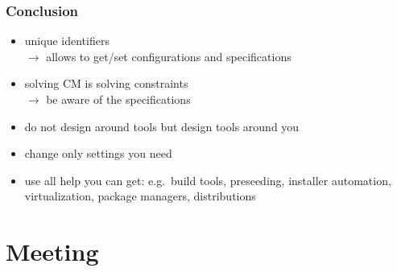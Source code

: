 \begin{frame}
	\frametitle{Conclusion}

	\begin{itemize}[<+-| alert@+>]
	\item unique identifiers \\ $\rightarrow$ allows to get/set configurations and specifications
	\item solving CM is solving constraints \\ $\rightarrow$ be aware of the specifications
	\item do not design around tools but design tools around you
	\item change only settings you need
	\item use all help you can get: e.g.\ build tools, preseeding, installer automation, virtualization, package managers, distributions
	\end{itemize}
\end{frame}



\section{Meeting}

